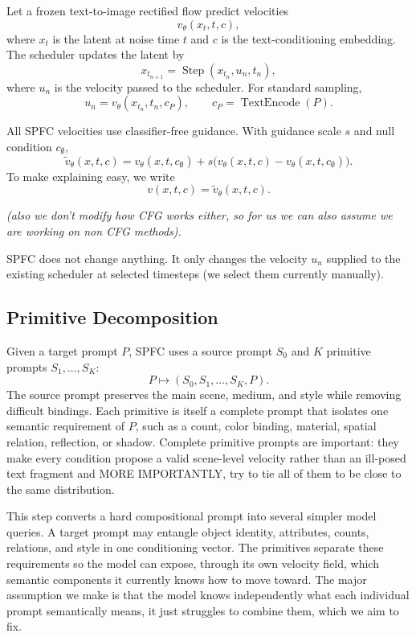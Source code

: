 \documentclass[letterpaper]{article} %
\newcommand{\Step}{\operatorname{Step}}
\newcommand{\TextEncode}{\operatorname{TextEncode}}
\begin{document}
Let a frozen text-to-image rectified flow predict velocities
\[
v_\theta(x_t,t,c),
\]
where $x_t$ is the latent at noise time $t$ and $c$ is the text-conditioning embedding.  
The scheduler updates the latent by
\[
x_{t_{n+1}}=\Step(x_{t_n},u_n,t_n),
\]
where $u_n$ is the velocity passed to the scheduler. For standard sampling,
\[
u_n=v_\theta(x_{t_n},t_n,c_P), 
\qquad c_P=\TextEncode(P).
\]

All SPFC velocities use classifier-free guidance. With guidance scale $s$ and null condition $c_\emptyset$,
\[
\tilde v_\theta(x,t,c)
=
v_\theta(x,t,c_\emptyset)
+
s\bigl(v_\theta(x,t,c)-v_\theta(x,t,c_\emptyset)\bigr).
\]
To make explaining easy, we write 
\[
v(x,t,c)=\tilde v_\theta(x,t,c).
\]

\emph{(also we don't modify how CFG works either, so for us we can also assume we are working on non CFG methods).}

SPFC does not change anything. It only changes the velocity $u_n$ supplied to the existing scheduler at selected timesteps (we select them currently manually).

\subsection{Primitive Decomposition}

Given a target prompt $P$, SPFC uses a source prompt $S_0$ and $K$
primitive prompts $S_1,\ldots,S_K$:
\begin{equation}
P \mapsto (S_0,S_1,\ldots,S_K,P).
\end{equation}
The source prompt preserves the main scene, medium, and style while
removing difficult bindings. Each primitive is itself a complete prompt
that isolates one semantic requirement of $P$, such as a count, color
binding, material, spatial relation, reflection, or shadow. Complete
primitive prompts are important: they make every condition propose a
valid scene-level velocity rather than an ill-posed text fragment and MORE IMPORTANTLY, try to tie all of them to be close to the same distribution.

This step converts a hard compositional prompt into several simpler
model queries. A target prompt may entangle object identity, attributes,
counts, relations, and style in one conditioning vector. The primitives
separate these requirements so the model can expose, through its own
velocity field, which semantic components it currently knows how to
move toward. The major assumption we make is that the model knows independently what each individual prompt semantically means, it just struggles to combine them, which we aim to fix.
\end{document}
